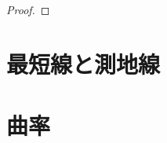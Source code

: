 \documentclass[report]{jlreq}
\begin{document}
\begin{proof}
    \TODO{}
\end{proof}

%
\section{最短線と測地線}

\TODO{}

%
\section{曲率}

\begin{definition}[$(1, 3)$-曲率テンソル]
    \TODO{}
\end{definition}

\begin{definition}[$(0, 4)$-曲率テンソル]
    \TODO{}
\end{definition}

\begin{definition}[接続に関する平坦性]
\end{definition}
\end{document}
